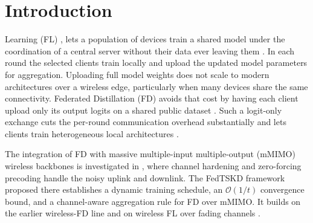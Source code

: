 \documentclass[journal]{IEEEtran}
\newcommand{\rev}[1]{{\color{blue}#1}}
\begin{document}
{\renewcommand{\abstractname}{Impact Statement}
\begin{abstract}
\rev{Wireless networks are starting to train shared artificial intelligence models across phones, wearables and vehicles. The data never leaves the device. Only a handful of devices can be served in each training round. Picking them at random means some devices contribute far more than others. Whose data shapes the model then becomes partly a matter of chance. This work replaces that lottery with a rotation. Its fairness follows from three quantities a network operator already knows. It can therefore be stated before a deployment is switched on. Operators give up no accuracy in exchange. Artificial intelligence systems are increasingly asked to evidence fair treatment of the people they serve. Committing to a participation guarantee in advance, rather than reporting one in hindsight, changes what a deployment can promise its users and its regulators.}
\end{abstract}}
\vspace{-1em}
\section{Introduction}
\label{sec:introduction}
 Learning (FL) \cite{mcmahan2017communication}, \cite{borazjani2026redefining} lets a population of devices train a shared model under the coordination of a central server without their data ever leaving them \cite{rao2025privacy, huang2024survey}. In each round the selected clients train locally and upload the updated model parameters for aggregation. Uploading full model weights does not scale to modern architectures over a wireless edge, particularly when many devices share the same connectivity. Federated Distillation (FD) \cite{jeong2018communication} avoids that cost by having each client upload only its output logits on a shared public dataset \cite{itahara2023distillation}. Such a logit-only exchange cuts the per-round communication overhead substantially and lets clients train heterogeneous local architectures \cite{sattler2022cfd, sattler2023fedaux, chan2021fedhe, cho2023clustered, wu2024fedict}.

The integration of FD with massive multiple-input multiple-output (mMIMO) wireless backbones is investigated in \cite{mu2024fedtskd}, where channel hardening and zero-forcing precoding handle the noisy uplink and downlink. The FedTSKD framework proposed there establishes a dynamic training schedule, an $\mathcal{O}(1/t)$ convergence bound, and a channel-aware aggregation rule for FD over mMIMO. It builds on the earlier wireless-FD line \cite{ahn2019wireless} and on wireless FL over fading channels \cite{amiri2020federated, vu2020cell}.
\end{document}
